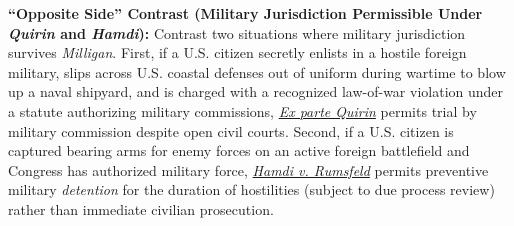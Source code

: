 \documentclass[12pt]{article}
\begin{document}
\textbf{``Opposite Side'' Contrast (Military Jurisdiction Permissible Under \textit{Quirin} and \textit{Hamdi}):} Contrast two situations where military jurisdiction survives \textit{Milligan}. First, if a U.S. citizen secretly enlists in a hostile foreign military, slips across U.S. coastal defenses out of uniform during wartime to blow up a naval shipyard, and is charged with a recognized law-of-war violation under a statute authorizing military commissions, \href{https://supreme.justia.com/cases/federal/us/317/1/}{\textit{Ex parte Quirin}} permits trial by military commission despite open civil courts. Second, if a U.S. citizen is captured bearing arms for enemy forces on an active foreign battlefield and Congress has authorized military force, \href{https://supreme.justia.com/cases/federal/us/542/507/}{\textit{Hamdi v. Rumsfeld}} permits preventive military \textit{detention} for the duration of hostilities (subject to due process review) rather than immediate civilian prosecution.
\end{document}
